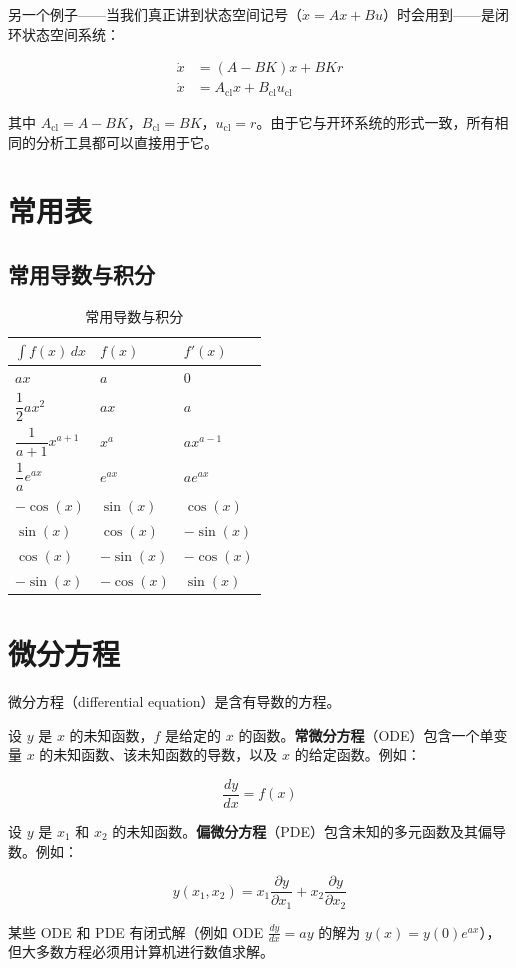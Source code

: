 另一个例子——当我们真正讲到状态空间记号（$\dot{x} = Ax + Bu$）时会用到——是闭环状态空间系统：

\begin{align*}
  \dot{x} &= (A - BK)x + BKr \\
  \dot{x} &= A_{\mathrm{cl}} x + B_{\mathrm{cl}} u_{\mathrm{cl}}
\end{align*}

其中 $A_{\mathrm{cl}} = A - BK$，$B_{\mathrm{cl}} = BK$，$u_{\mathrm{cl}} = r$。由于它与开环系统的形式一致，所有相同的分析工具都可以直接用于它。

\section{常用表}
\label{sec:tables}

\subsection{常用导数与积分}
\label{sec:commonderivatives}

\begin{table}[htbp]
  \centering
  \begin{tabular}{lll}
    \toprule
    $\displaystyle\int f(x) \, dx$ & $f(x)$ & $f'(x)$ \\
    \midrule
    $ax$ & $a$ & $0$ \\
    $\dfrac{1}{2} a x^2$ & $ax$ & $a$ \\
    $\dfrac{1}{a+1} x^{a+1}$ & $x^a$ & $a x^{a-1}$ \\
    $\dfrac{1}{a} e^{ax}$ & $e^{ax}$ & $a e^{ax}$ \\
    $-\cos(x)$ & $\sin(x)$ & $\cos(x)$ \\
    $\sin(x)$ & $\cos(x)$ & $-\sin(x)$ \\
    $\cos(x)$ & $-\sin(x)$ & $-\cos(x)$ \\
    $-\sin(x)$ & $-\cos(x)$ & $\sin(x)$ \\
    \bottomrule
  \end{tabular}
  \caption{常用导数与积分}
  \label{tab:common-deriv-int}
\end{table}

\section{微分方程}
\label{sec:odes}

微分方程（differential equation）是含有导数的方程。

设 $y$ 是 $x$ 的未知函数，$f$ 是给定的 $x$ 的函数。\textbf{常微分方程}（ODE）包含一个单变量 $x$ 的未知函数、该未知函数的导数，以及 $x$ 的给定函数。例如：

\[
  \frac{dy}{dx} = f(x)
\]

设 $y$ 是 $x_1$ 和 $x_2$ 的未知函数。\textbf{偏微分方程}（PDE）包含未知的多元函数及其偏导数。例如：

\[
  y(x_1, x_2) = x_1 \frac{\partial y}{\partial x_1} + x_2 \frac{\partial y}{\partial x_2}
\]

某些 ODE 和 PDE 有闭式解（例如 ODE $\frac{dy}{dx} = ay$ 的解为 $y(x) = y(0) e^{ax}$），但大多数方程必须用计算机进行数值求解。
